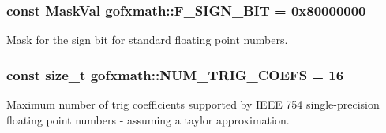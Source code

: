 \subsubsection[{F\+\_\+\+S\+I\+G\+N\+\_\+\+B\+I\+T}]{\setlength{\rightskip}{0pt plus 5cm}const Mask\+Val gofxmath\+::\+F\+\_\+\+S\+I\+G\+N\+\_\+\+B\+I\+T = 0x80000000}\label{group___scalar_math_consts_gae9346089acea1670286e7cbe27bdbbbb}


Mask for the sign bit for standard floating point numbers. 

\hypertarget{group___scalar_math_consts_gab7b8a16b47f0cca40952e44fdd24f87d}{}
\subsubsection[{N\+U\+M\+\_\+\+T\+R\+I\+G\+\_\+\+C\+O\+E\+F\+S}]{\setlength{\rightskip}{0pt plus 5cm}const size\+\_\+t gofxmath\+::\+N\+U\+M\+\_\+\+T\+R\+I\+G\+\_\+\+C\+O\+E\+F\+S = 16}\label{group___scalar_math_consts_gab7b8a16b47f0cca40952e44fdd24f87d}


Maximum number of trig coefficients supported by I\+E\+E\+E 754 single-\/precision floating point numbers -\/ assuming a taylor approximation. 

